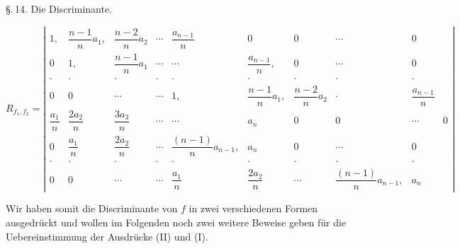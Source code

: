 \documentclass[11pt]{article}
\providecommand{\weberpage}[1]{}
\begin{document}
\weberpage{187}

\S.\,14. Die Discriminante.

\[
R_{f_1,f_2} =
\left|
\begin{array}{cccccccccc}
1, & \dfrac{n-1}{n}a_1, & \dfrac{n-2}{n}a_2 & \cdots & \dfrac{a_{n-1}}{n} & 0 & 0 & \cdots & 0 \\[2ex]
0 & 1, & \dfrac{n-1}{n}a_1 & \cdots & \cdots & \dfrac{a_{n-1}}{n}, & 0 & \cdots & 0 \\[2ex]
\cdot & \cdot & \cdot & \cdot & \cdot & \cdot & \cdot & \cdot & \cdot \\[1ex]
0 & 0 & \cdots & \cdots & 1, & \dfrac{n-1}{n}a_1, & \dfrac{n-2}{n}a_2 & \cdot & \dfrac{a_{n-1}}{n} \\[2ex]
\dfrac{a_1}{n} & \dfrac{2a_2}{n} & \dfrac{3a_3}{n} & \cdots & \cdots & a_n & 0 & 0 & \cdots & 0 \\[2ex]
0 & \dfrac{a_1}{n} & \dfrac{2a_2}{n} & \cdots & \dfrac{(n-1)}{n}a_{n-1}, & a_n & 0 & \cdots & 0 \\[2ex]
\cdot & \cdot & \cdot & \cdot & \cdot & \cdot & \cdot & \cdot & \cdot \\[1ex]
0 & 0 & \cdots & \cdots & \dfrac{a_1}{n} & \dfrac{2a_2}{n} & \cdots & \dfrac{(n-1)}{n}a_{n-1}, & a_n
\end{array}
\right| \tag{II}
\]

Wir haben somit die Discriminante von $f$ in zwei verschiedenen Formen ausgedrückt und wollen im Folgenden noch zwei weitere Beweise geben für die Uebereinstimmung der Ausdrücke (II) und (I).
\end{document}
